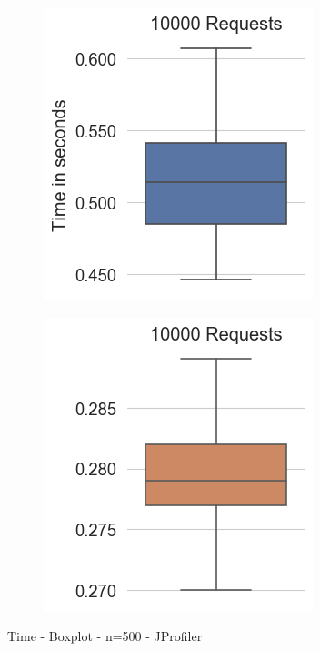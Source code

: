 \begin{figure}[H]
  \centering
  \begin{subfigure}[b]{0.45\textwidth}
    \includegraphics[width=1.0\linewidth]{img/footprint/boxplots-t-500.png}
  \end{subfigure}
  \begin{subfigure}[b]{0.45\textwidth}
    \includegraphics[width=1.0\linewidth]{img/footprint/boxplots-vt-500.png}
  \end{subfigure}
  \caption{Time - Boxplot - n=500 - JProfiler}
\end{figure}

